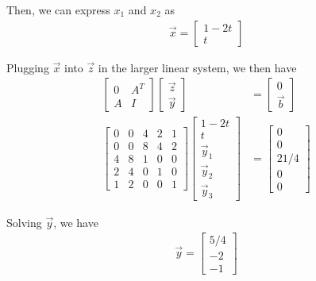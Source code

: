 \documentclass[a4paper,10pt]{article}
\begin{document}
\begin{enumerate}
\begin{enumerate}
{\begin{enumerate}
            Then, we can express $x_1$ and $x_2$ as
            \begin{align}
                \vec{x} = \begin{bmatrix} 1-2t \\ t \end{bmatrix}
            \end{align}

            Plugging $\vec{x}$ into $\vec{z}$ in the larger linear system, we then have
            \begin{align}
                \begin{bmatrix} 0 & A^T \\ A & I \end{bmatrix} \begin{bmatrix} \vec{z} \\ \vec{y} \end{bmatrix} &= \begin{bmatrix} 0 \\ \vec{b} \end{bmatrix} \\
                \begin{bmatrix} 0 & 0 & 4 & 2 & 1 \\ 0 & 0 & 8 & 4 & 2 \\ 4 & 8 & 1 & 0 & 0 \\ 2 & 4 & 0 & 1 & 0 \\ 1 & 2 & 0 & 0 & 1 \end{bmatrix} \begin{bmatrix} 1-2t \\ t \\ \vec{y}_1 \\ \vec{y}_2 \\ \vec{y}_3 \end{bmatrix} &= \begin{bmatrix} 0 \\ 0 \\ 21/4 \\ 0 \\ 0 \end{bmatrix}
            \end{align}

            Solving $\vec{y}$, we have
            \begin{align}
                \vec{y} = \begin{bmatrix}5/4 \\ -2 \\ -1\end{bmatrix}
            \end{align}


\end{enumerate}}
\end{enumerate}
\end{enumerate}
\end{document}
